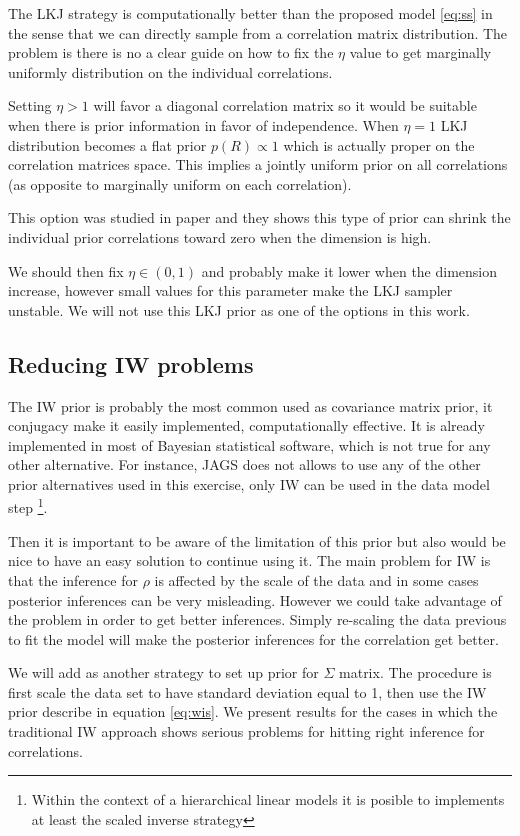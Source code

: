 \documentclass{article}
\begin{document}
The LKJ strategy  is computationally better than the proposed model \ref{eq:ss} in the sense that we can directly sample from a correlation matrix distribution.  The problem is there is no a clear guide on how to fix the $\eta$ value to get marginally uniformly distribution on the individual correlations. 

Setting $\eta > 1$ will favor a diagonal correlation matrix so it would be suitable when there is prior information in favor of independence.  When $\eta=1$ LKJ distribution becomes a flat prior $p(R) \propto 1$ which is actually proper on the correlation matrices space. This implies a jointly uniform prior on all correlations (as opposite to marginally uniform on each correlation). 

This option was studied in \cite{barnard2000}  paper and they shows this type of prior can shrink the individual prior correlations  toward zero when the dimension is high.   

We should then fix $\eta \in (0,1)$ and probably make it lower when the dimension increase, however small values for this parameter make the LKJ sampler unstable. We will not use this LKJ prior as one of the options in this work. 

\subsection{ Reducing IW problems }
The IW prior is probably the most common used as covariance matrix prior, it conjugacy make it easily implemented, computationally effective. It is already implemented in most of Bayesian statistical software, which is not true for any other alternative. For instance, JAGS does not allows to use any of the other prior alternatives used in this exercise, only IW can be used in the data model step \footnote{Within the context of a hierarchical linear models it is posible to implements at least the scaled inverse strategy}.  

Then it is important to be aware of the limitation of this prior but also would be nice to have an easy solution to continue using it. The main problem for IW is that the inference for $\rho$ is affected by the scale of the data and in some cases posterior inferences can be very misleading. However we could take advantage of the problem in order to get better inferences. Simply re-scaling the data previous to fit the model will make the posterior inferences for the correlation get better. 

We will add as another strategy to set up prior for $\Sigma$ matrix. The procedure is first scale the data set to have standard deviation equal to 1, then use the IW prior describe in equation \ref{eq:wis}. We present results for the cases in which the traditional IW approach shows serious problems for hitting right inference for correlations. 
\end{document}
